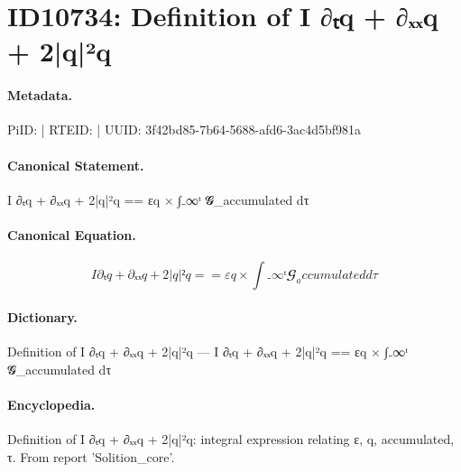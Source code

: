\section*{ID10734: Definition of I ∂ₜq + ∂ₓₓq + 2|q|²q}
\paragraph{Metadata.}
PiID:  | RTEID:  | UUID: 3f42bd85-7b64-5688-afd6-3ac4d5bf981a

\paragraph{Canonical Statement.}
I ∂ₜq + ∂ₓₓq + 2|q|²q == εq × ∫₋∞ᵗ 𝓖\_accumulated dτ

\paragraph{Canonical Equation.}
\[
I ∂ₜq + ∂ₓₓq + 2|q|²q == εq × ∫₋∞ᵗ 𝓖_accumulated dτ
\]

\paragraph{Dictionary.}
Definition of I ∂ₜq + ∂ₓₓq + 2|q|²q — I ∂ₜq + ∂ₓₓq + 2|q|²q == εq × ∫₋∞ᵗ 𝓖\_accumulated dτ

\paragraph{Encyclopedia.}
Definition of I ∂ₜq + ∂ₓₓq + 2|q|²q: integral expression relating ε, q, accumulated, τ. From report 'Solition\_core'.
